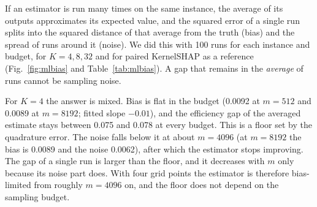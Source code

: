 \documentclass[conference]{IEEEtran}
\begin{document}
\begin{table}[t]
\caption{Decomposition of the error of the multilinear estimator ($d=12$, 100 replicates $\times$ 10 instances). Bias and noise are relative $\ell_2$ magnitudes; the efficiency gap is in log-odds units.}
\label{tab:mlbias}
\centering
\small
\setlength{\tabcolsep}{3pt}
\end{table}

If an estimator is run many times on the same instance, the average of its outputs approximates its expected value, and the squared error of a single run splits into the squared distance of that average from the truth (bias) and the spread of runs around it (noise). We did this with 100 runs for each instance and budget, for $K=4,8,32$ and for paired KernelSHAP as a reference (Fig.~\ref{fig:mlbias} and Table~\ref{tab:mlbias}). A gap that remains in the \emph{average} of runs cannot be sampling noise.

For $K=4$ the answer is mixed. Bias is flat in the budget (0.0092 at $m=512$ and 0.0089 at $m=8192$; fitted slope $-0.01$), and the efficiency gap of the averaged estimate stays between 0.075 and 0.078 at every budget. This is a floor set by the quadrature error. The noise falls below it at about $m=4096$ (at $m=8192$ the bias is 0.0089 and the noise 0.0062), after which the estimator stops improving. The gap of a single run is larger than the floor, and it decreases with $m$ only because its noise part does. With four grid points the estimator is therefore bias-limited from roughly $m=4096$ on, and the floor does not depend on the sampling budget.
\end{document}
